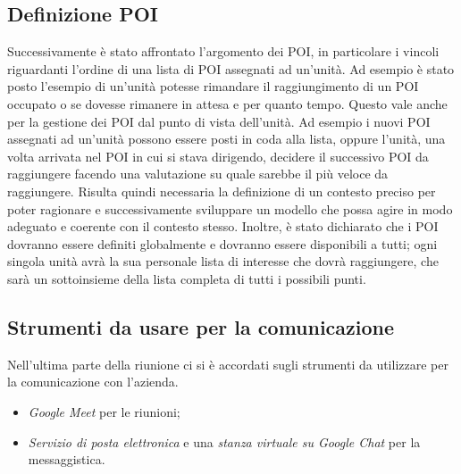 \subsection{Definizione POI}
Successivamente è stato affrontato l'argomento dei POI, in particolare i vincoli riguardanti l'ordine di una lista di POI assegnati ad un'unità. Ad esempio è stato posto l'esempio di un'unità potesse rimandare il raggiungimento di un POI occupato o se dovesse rimanere in attesa e per quanto tempo. 
Questo vale anche per la gestione dei POI dal punto di vista dell'unità. Ad esempio i nuovi POI assegnati ad un'unità possono essere posti in coda alla lista, oppure l'unità, una volta arrivata nel POI in cui si stava dirigendo, decidere il successivo POI da raggiungere facendo una valutazione su quale sarebbe il più veloce da raggiungere. 
Risulta quindi necessaria la definizione di un contesto preciso per poter ragionare e successivamente sviluppare un modello che possa agire in modo adeguato e coerente con il contesto stesso.
Inoltre, è stato dichiarato che i POI dovranno essere definiti globalmente e dovranno essere disponibili a tutti; ogni singola unità avrà la sua personale lista di interesse che dovrà raggiungere, che sarà un sottoinsieme della lista completa di tutti i possibili punti.

\subsection{Strumenti da usare per la comunicazione}
Nell'ultima parte della riunione ci si è accordati sugli strumenti da utilizzare per la comunicazione con l'azienda. 
\begin{itemize}
	\item \textit{Google Meet} per le riunioni;
	\item \textit{Servizio di posta elettronica} e una \textit{stanza virtuale su Google Chat} per la messaggistica.
\end{itemize}